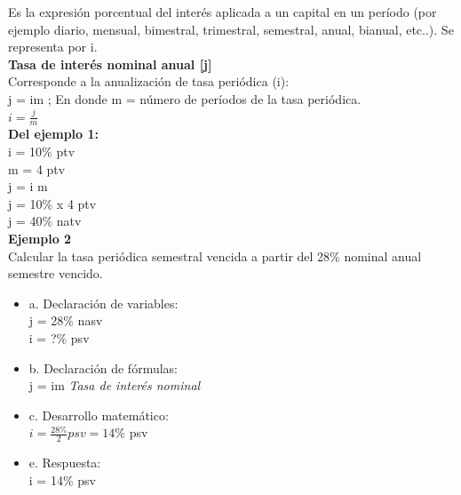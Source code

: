 Es la expresión porcentual del interés aplicada a un capital en un período (por ejemplo diario, mensual, bimestral, trimestral, semestral, anual, bianual, etc..). Se representa por i.\\

\textbf{Tasa de interés nominal anual [j]}\\

Corresponde a la anualización de tasa periódica (i):\\

j = im ; En donde m = número de períodos de la tasa periódica.\\

$i = \frac{j}{m}$ \hspace{2 cm} \\

\textbf{Del ejemplo 1:}\\

i = 10\%  ptv\\
m = 4 ptv\\
j = i  m\\
j = 10\% x 4 ptv\\
j = 40\% natv\\

\textbf{Ejemplo 2}\\

Calcular la tasa periódica semestral vencida a partir del 28\% nominal anual semestre vencido. \\
\begin{itemize}
	
	\item a. Declaración de variables:\\
	
	j = 28\% nasv\\
	i = ?\% psv\\
	
	\item b. Declaración de fórmulas:\\
	
	j = im  \hspace{35 pt} \textit{Tasa de interés nominal}
	
	\item c. Desarrollo matemático:\\
	
	$i = \frac{28\%}{2} psv = 14\% $ psv\\
	
	\item e. Respuesta:\\
	
	i = 14\% psv\\
	
\end{itemize}

